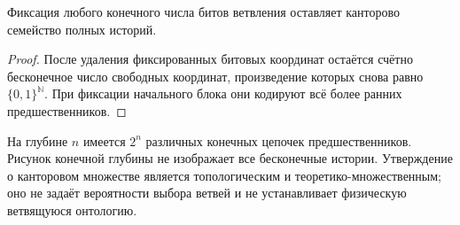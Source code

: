 \begin{corollary}
\label{cor:finite-backward}
{Фиксация любого конечного числа битов ветвления оставляет канторово семейство полных историй.}
\end{corollary}
\begin{proof}
{После удаления фиксированных битовых координат остаётся счётно бесконечное число свободных координат, произведение которых снова равно $\{0,1\}^{\mathbb N}$. При фиксации начального блока они кодируют всё более ранних предшественников.}
\end{proof}
{На глубине $n$ имеется $2^n$ различных конечных цепочек предшественников. Рисунок конечной глубины не изображает все бесконечные истории. Утверждение о канторовом множестве является топологическим и теоретико-множественным; оно не задаёт вероятности выбора ветвей и не устанавливает физическую ветвящуюся онтологию.}

